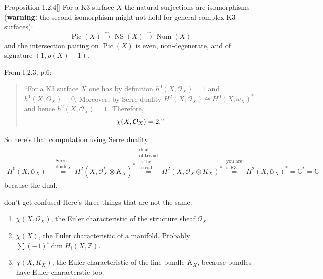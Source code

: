 \begin{thing4}{Proposition 1.2.4}[\cite{huk}]\label{prop:1.2.4}\leavevmode
For a K3 surface \(X\) the natural surjections are isomorphisms (\textbf{warning:} the second isomorphism might not hold for general complex K3 surfaces):
\[\operatorname{Pic}(X) \xrightarrow{\sim}\operatorname{NS}(X)\xrightarrow{\sim}\operatorname{Num}(X)\]
and the intersection pairing on \(\operatorname{Pic}(X)\) is even, non-degenerate, and of signature \((1,\rho(X)-1)\).
\end{thing4}

\begin{remark}[\(\chi(\text{K3},\mathcal{O}_X)=2\)]\leavevmode
From \cite{huk} I.2.3, p.6:
\begin{quotation}
	``For a K3 surface \(X\) one has by definition \(h^{0}(X,\mathcal{O}_X)=1\) and \(h^{1}(X,O_X)=0\). Moreover, by Serre duality \(H^{2}(X,\mathcal{O}_X)\cong H^{0}(X,\omega_X)^*\) and hence \(h^{2}(X,\mathcal{O}_X)=1\). Therefore,
	\[\chi(X,\mathcal{O}_X)=2."\]
\end{quotation}
So here's that computation using Serre duality:
\begin{align*}
H^{0}(X,\mathcal{O}_X)&\overset{\substack{\text{Serre}  \\ \text{duality} } }{=}H^{2}(X,\mathcal{O}_X^*\otimes K_X)^* \overset{\substack{\text{dual}  \\ \text{of trivial} \\ \text{is the}\\\text{trivial} }}{=}H^{2}(X,\mathcal{O}_X \otimes K_X)^* \overset{\substack{\text{you are}  \\ \text{a K3} } }{=}H^{2}(X,\mathcal{O}_X)^*=\mathbb{C}^*=\mathbb{C}
\end{align*}
because the dual.
\end{remark}

\begin{thing7}{don't get confused}\leavevmode
Here's three things that are not the same:
\begin{enumerate}
\item \(\chi(X,\mathcal{O}_X)\), the Euler characteristic of the structure sheaf \(\mathcal{O}_X\).
\item \(\chi(X)\), the Euler characteristic of a manifold. Probably \(\sum (-1)^i \dim H_{i}(X,\mathbb{Z})\).
\item \(\chi(X,K_X)\), the Euler characteristic of the line bundle \(K_X\), because bundles have Euler characterstic too.
\end{enumerate}
\end{thing7}

